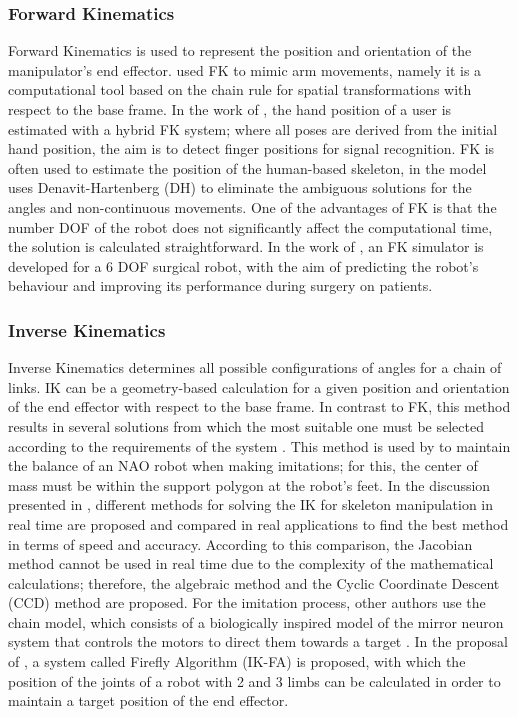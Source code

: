 \documentclass[thesis]{mas_proposal}
\begin{document}
	\subsubsection{Forward Kinematics}
	
		Forward Kinematics is used to represent the position and orientation of the manipulator's end effector. \cite{Assad2020} used FK to mimic arm movements, namely it is a computational tool based on the chain rule for spatial transformations with respect to the base frame. In the work of \cite{Malik2017}, the hand position of a user is estimated with a hybrid FK system; where all poses are derived from the initial hand position, the aim is to detect finger positions for signal recognition. FK is often used to estimate the position of the human-based skeleton, in \cite{Huang2022} the model uses Denavit-Hartenberg (DH) to eliminate the ambiguous solutions for the angles and non-continuous movements. One of the advantages of FK is that the number DOF of the robot does not significantly affect the computational time, the solution is calculated straightforward. In the work of \cite{Shao2015}, an FK simulator is developed for a 6 DOF surgical robot, with the aim of predicting the robot's behaviour and improving its performance during surgery on patients.
	
	\subsubsection{Inverse Kinematics}
	
		Inverse Kinematics determines all possible configurations of angles for a chain of links. IK can be a geometry-based calculation for a given position and orientation of the end effector with respect to the base frame. In contrast to FK, this method results in several solutions from which the most suitable one must be selected according to the requirements of the system \cite{Mueller2019}. This method is used by \cite{Koenemann2012, Koenemann2014} to maintain the balance of an NAO robot when making imitations; for this, the center of mass must be within the support polygon at the robot's feet. In the discussion presented in \cite{Martin2003}, different methods for solving the IK for skeleton manipulation in real time are proposed and compared in real applications to find the best method in terms of speed and accuracy. According to this comparison, the Jacobian method cannot be used in real time due to the complexity of the mathematical calculations; therefore, the algebraic method and the Cyclic Coordinate Descent (CCD) method are proposed. For the imitation process, other authors use the chain model, which consists of a biologically inspired model of the mirror neuron system that controls the motors to direct them towards a target \cite{Chersi2012}. In the proposal of \cite{Rokbani2014}, a system called Firefly Algorithm (IK-FA) is proposed, with which the position of the joints of a robot with 2 and 3 limbs can be calculated in order to maintain a target position of the end effector.
	
\end{document}
